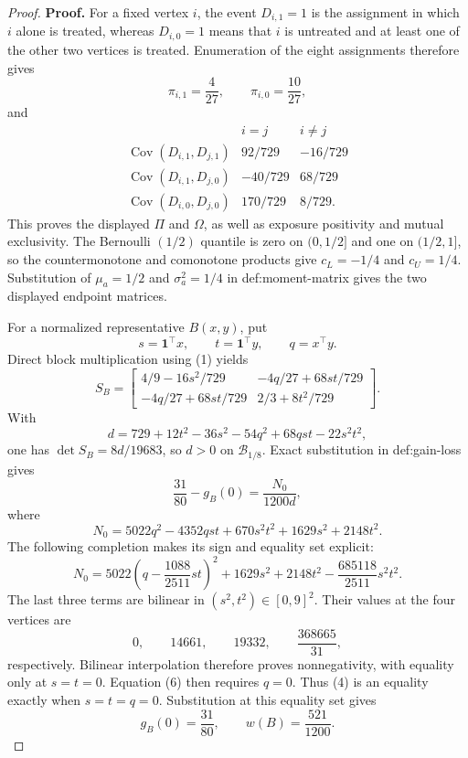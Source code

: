 \documentclass{article}
\begin{document}
\begin{proof}
\textbf{Proof.}
For a fixed vertex \(i\), the event \(D_{i,1}=1\) is the assignment in which \(i\) alone is treated, whereas \(D_{i,0}=1\) means that \(i\) is untreated and at least one of the other two vertices is treated.  Enumeration of the eight assignments therefore gives
\[
\pi_{i,1}=\frac4{27},
\qquad
\pi_{i,0}=\frac{10}{27},
\]
and
\[
\begin{array}{c|cc}
&i=j&i\ne j\\ \hline
\operatorname{Cov}(D_{i,1},D_{j,1})&92/729&-16/729\\
\operatorname{Cov}(D_{i,1},D_{j,0})&-40/729&68/729\\
\operatorname{Cov}(D_{i,0},D_{j,0})&170/729&8/729.
\end{array}
\tag{1}
\]
This proves the displayed \(\Pi\) and \(\Omega\), as well as exposure positivity and mutual exclusivity.  The Bernoulli \((1/2)\) quantile is zero on \((0,1/2]\) and one on \((1/2,1]\), so the countermonotone and comonotone products give \(c_L=-1/4\) and \(c_U=1/4\).  Substitution of \(\mu_a=1/2\) and \(\sigma_a^2=1/4\) in def:moment-matrix gives the two displayed endpoint matrices.

For a normalized representative \(B(x,y)\), put
\[
s=\mathbf1^{\top}x,
\qquad t=\mathbf1^{\top}y,
\qquad q=x^{\top}y.
\]
Direct block multiplication using (1) yields
\[
S_B=
\begin{bmatrix}
4/9-16s^2/729&-4q/27+68st/729\\
-4q/27+68st/729&2/3+8t^2/729
\end{bmatrix}.
\tag{2}
\]
With
\[
d=729+12t^2-36s^2-54q^2+68qst-22s^2t^2,
\tag{3}
\]
one has \(\det S_B=8d/19683\), so \(d>0\) on \(\mathcal B_{1/8}\).  Exact substitution in def:gain-loss gives
\[
\frac{31}{80}-g_B(0)=\frac{N_0}{1200d},
\tag{4}
\]
where
\[
N_0=5022q^2-4352qst+670s^2t^2+1629s^2+2148t^2.
\tag{5}
\]
The following completion makes its sign and equality set explicit:
\[
N_0
=5022\left(q-\frac{1088}{2511}st\right)^2
+1629s^2+2148t^2-\frac{685118}{2511}s^2t^2.
\tag{6}
\]
The last three terms are bilinear in \((s^2,t^2)\in[0,9]^2\).  Their values at the four vertices are
\[
0,\qquad14661,\qquad19332,\qquad\frac{368665}{31},
\]
respectively.  Bilinear interpolation therefore proves nonnegativity, with equality only at \(s=t=0\).  Equation (6) then requires \(q=0\).  Thus (4) is an equality exactly when \(s=t=q=0\).  Substitution at this equality set gives
\[
g_B(0)=\frac{31}{80},
\qquad
w(B)=\frac{521}{1200}.
\tag{7}
\]


\end{proof}
\end{document}
